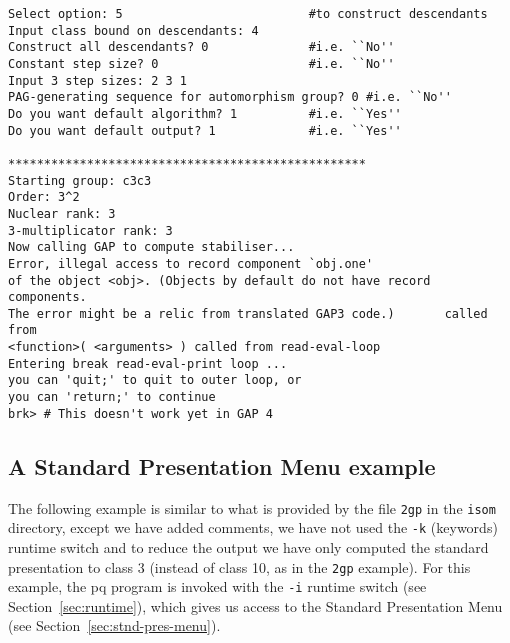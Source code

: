 \documentclass[12pt]{article}
\begin{document}
\begin{verbatim}
Select option: 5                          #to construct descendants
Input class bound on descendants: 4
Construct all descendants? 0              #i.e. ``No''
Constant step size? 0                     #i.e. ``No''
Input 3 step sizes: 2 3 1
PAG-generating sequence for automorphism group? 0 #i.e. ``No''
Do you want default algorithm? 1          #i.e. ``Yes''
Do you want default output? 1             #i.e. ``Yes''

**************************************************
Starting group: c3c3
Order: 3^2
Nuclear rank: 3
3-multiplicator rank: 3
Now calling GAP to compute stabiliser...
Error, illegal access to record component `obj.one'
of the object <obj>. (Objects by default do not have record components.
The error might be a relic from translated GAP3 code.)       called from
<function>( <arguments> ) called from read-eval-loop
Entering break read-eval-print loop ...
you can 'quit;' to quit to outer loop, or
you can 'return;' to continue
brk> # This doesn't work yet in GAP 4
\end{verbatim}

\subsection{A Standard Presentation Menu example}

The following example is similar to what is provided by the file \verb|2gp|
in the \texttt{isom} directory, except we have added comments, we
have not used the \texttt{-k} (keywords) runtime switch and to reduce the
output we have only computed the standard presentation to class 3 (instead
of class 10, as in the \verb|2gp| example).
For this example, the pq program is invoked with the \texttt{-i} runtime
switch (see Section~\ref{sec:runtime}), which gives us access to the
Standard Presentation Menu (see Section~\ref{sec:stnd-pres-menu}).
\end{document}
